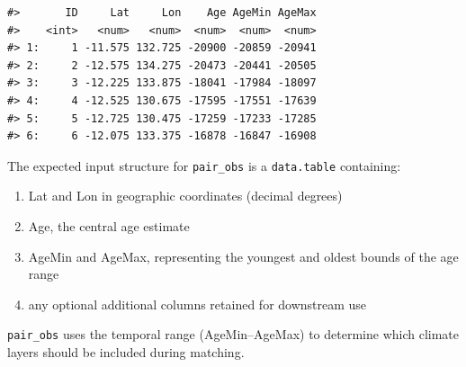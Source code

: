 \documentclass[
]{article}
\newenvironment{Shaded}{\begin{snugshade}}{\end{snugshade}}
\newcommand{\AttributeTok}[1]{\textcolor[rgb]{0.13,0.29,0.53}{#1}}
\newcommand{\DecValTok}[1]{\textcolor[rgb]{0.00,0.00,0.81}{#1}}
\newcommand{\FunctionTok}[1]{\textcolor[rgb]{0.13,0.29,0.53}{\textbf{#1}}}
\newcommand{\NormalTok}[1]{#1}
\newcommand{\OtherTok}[1]{\textcolor[rgb]{0.56,0.35,0.01}{#1}}
\newcommand{\SpecialCharTok}[1]{\textcolor[rgb]{0.81,0.36,0.00}{\textbf{#1}}}
\begin{document}
\begin{Shaded}
\end{Shaded}

\begin{verbatim}
#>       ID     Lat     Lon    Age AgeMin AgeMax
#>    <int>   <num>   <num>  <num>  <num>  <num>
#> 1:     1 -11.575 132.725 -20900 -20859 -20941
#> 2:     2 -12.575 134.275 -20473 -20441 -20505
#> 3:     3 -12.225 133.875 -18041 -17984 -18097
#> 4:     4 -12.525 130.675 -17595 -17551 -17639
#> 5:     5 -12.725 130.475 -17259 -17233 -17285
#> 6:     6 -12.075 133.375 -16878 -16847 -16908
\end{verbatim}

The expected input structure for \texttt{pair\_obs} is a
\texttt{data.table} containing:

\begin{enumerate}
\def\labelenumi{\arabic{enumi}.}
\item
  Lat and Lon in geographic coordinates (decimal degrees)
\item
  Age, the central age estimate
\item
  AgeMin and AgeMax, representing the youngest and oldest bounds of the
  age range
\item
  any optional additional columns retained for downstream use
\end{enumerate}

\texttt{pair\_obs} uses the temporal range (AgeMin--AgeMax) to determine
which climate layers should be included during matching.
\end{document}
